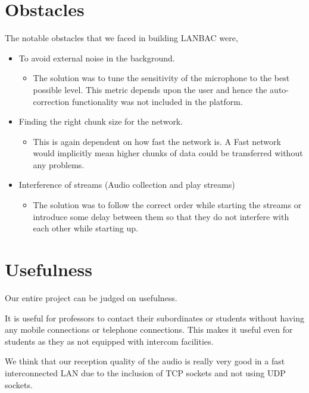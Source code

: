 \documentclass[12pt]{article}
\begin{document}
\section{Obstacles}
The notable obstacles that we faced in building LANBAC were,
\begin{itemize}

    \item To avoid external noise in the background.
        \begin{itemize}
            \item The solution was to tune the sensitivity of the microphone to the best possible level. This metric depends upon the user and hence the auto-correction functionality was not included in the platform.
        \end{itemize}
    \item Finding the right chunk size for the network.
        \begin{itemize}
            \item This is again dependent on how fast the network is. A Fast network would implicitly mean higher chunks of data could be transferred without any problems.
        \end{itemize}
    \item Interference of streams (Audio collection and play streams)
        \begin{itemize}
            \item The solution was to follow the correct order while starting the streams or introduce some delay between them so that they do not interfere with each other while starting up.

        \end{itemize}
\end{itemize}



\section{Usefulness}
Our entire project can be judged on usefulness.

It is useful for professors to contact their subordinates or students without having any mobile connections or telephone connections. This makes it useful even for students as they as not equipped with intercom facilities.


We think that our reception quality of the audio is really very good in a fast interconnected LAN due to the inclusion of TCP sockets and not using UDP sockets.
\end{document}
